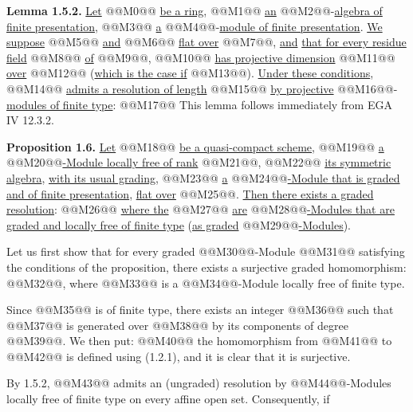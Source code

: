 \textbf{Lemma 1.5.2.} \uline{Let} @@M0@@ \uline{be a ring}, @@M1@@ \uline{an} @@M2@@-\uline{algebra of finite presentation}, @@M3@@ \uline{a} @@M4@@-\uline{module of finite presentation}. \uline{We suppose} @@M5@@ \uline{and} @@M6@@ \uline{flat over} @@M7@@, \uline{and} \uline{that for every residue field} @@M8@@ \uline{of} @@M9@@, @@M10@@ \uline{has projective dimension} @@M11@@ \uline{over} @@M12@@ (\uline{which is the case if} @@M13@@). \uline{Under these conditions}, @@M14@@ \uline{admits a resolution of length} @@M15@@ \uline{by projective} @@M16@@-\uline{modules of finite type}:
@@M17@@
This lemma follows immediately from EGA IV 12.3.2.

\textbf{Proposition 1.6.} \uline{Let} @@M18@@ \uline{be a quasi-compact scheme}, @@M19@@ \uline{a} @@M20@@\uline{-Module locally free of rank} @@M21@@, @@M22@@ \uline{its symmetric algebra}, \uline{with its usual grading}, @@M23@@ \uline{a} @@M24@@\uline{-Module that is graded and of finite presentation}, \uline{flat over} @@M25@@. \uline{Then there exists a graded resolution}:
@@M26@@
\uline{where the} @@M27@@ \uline{are} @@M28@@\uline{-Modules that are graded and locally free of finite type} (\uline{as graded} @@M29@@\uline{-Modules}).

Let us first show that for every graded @@M30@@-Module @@M31@@ satisfying the conditions of the proposition, there exists a surjective graded homomorphism: @@M32@@, where @@M33@@ is a @@M34@@-Module locally free of finite type.

Since @@M35@@ is of finite type, there exists an integer @@M36@@ such that @@M37@@ is generated over @@M38@@ by its components of degree @@M39@@. We then put:
@@M40@@
the homomorphism from @@M41@@ to @@M42@@ is defined using (1.2.1), and it is clear that it is surjective.

By 1.5.2, @@M43@@ admits an (ungraded) resolution by @@M44@@-Modules locally free of finite type on every affine open set. Consequently, if

